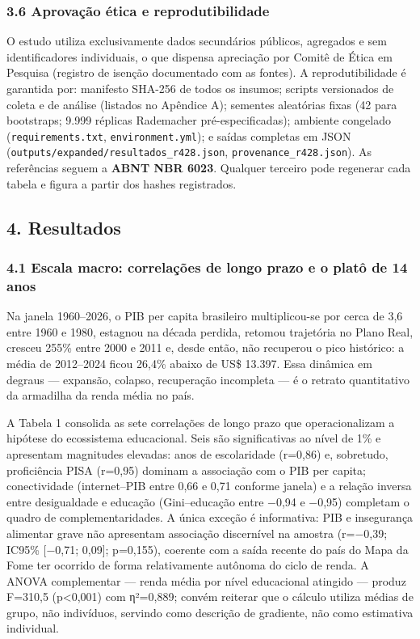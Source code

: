\documentclass[
  brazilian,
  12pt,
  a4paper,
]{article}
\begin{document}
\subsubsection{3.6 Aprovação ética e
reprodutibilidade}\label{aprovauxe7uxe3o-uxe9tica-e-reprodutibilidade}

O estudo utiliza exclusivamente dados secundários públicos, agregados e
sem identificadores individuais, o que dispensa apreciação por Comitê de
Ética em Pesquisa (registro de isenção documentado com as fontes). A
reprodutibilidade é garantida por: manifesto SHA-256 de todos os
insumos; scripts versionados de coleta e de análise (listados no
Apêndice A); sementes aleatórias fixas (42 para bootstraps; 9.999
réplicas Rademacher pré-especificadas); ambiente congelado
(\texttt{requirements.txt}, \texttt{environment.yml}); e saídas
completas em JSON (\texttt{outputs/expanded/resultados\_r428.json},
\texttt{provenance\_r428.json}). As referências seguem a \textbf{ABNT
NBR 6023}. Qualquer terceiro pode regenerar cada tabela e figura a
partir dos hashes registrados.

\subsection{4. Resultados}\label{resultados}

\subsubsection{4.1 Escala macro: correlações de longo prazo e o platô de
14
anos}\label{escala-macro-correlauxe7uxf5es-de-longo-prazo-e-o-platuxf4-de-14-anos}

Na janela 1960--2026, o PIB per capita brasileiro multiplicou-se por
cerca de 3,6 entre 1960 e 1980, estagnou na década perdida, retomou
trajetória no Plano Real, cresceu 255\% entre 2000 e 2011 e, desde
então, não recuperou o pico histórico: a média de 2012--2024 ficou
26,4\% abaixo de US\$ 13.397. Essa dinâmica em degraus --- expansão,
colapso, recuperação incompleta --- é o retrato quantitativo da
armadilha da renda média no país.

A Tabela 1 consolida as sete correlações de longo prazo que
operacionalizam a hipótese do ecossistema educacional. Seis são
significativas ao nível de 1\% e apresentam magnitudes elevadas: anos de
escolaridade (r=0,86) e, sobretudo, proficiência PISA (r=0,95) dominam a
associação com o PIB per capita; conectividade (internet--PIB entre 0,66
e 0,71 conforme janela) e a relação inversa entre desigualdade e
educação (Gini--educação entre −0,94 e −0,95) completam o quadro de
complementaridades. A única exceção é informativa: PIB e insegurança
alimentar grave não apresentam associação discernível na amostra
(r=−0,39; IC95\% {[}−0,71; 0,09{]}; p=0,155), coerente com a saída
recente do país do Mapa da Fome ter ocorrido de forma relativamente
autônoma do ciclo de renda. A ANOVA complementar --- renda média por
nível educacional atingido --- produz F=310,5 (p\textless0,001) com
η²=0,889; convém reiterar que o cálculo utiliza médias de grupo, não
indivíduos, servindo como descrição de gradiente, não como estimativa
individual.
\end{document}
